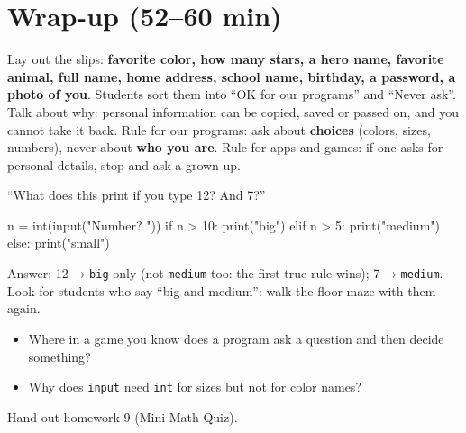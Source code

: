 \section{Wrap-up (52--60 min)}
\begin{safety}
Lay out the slips: \textbf{favorite color, how many stars, a hero name, favorite animal, full name, home address, school name, birthday, a password, a photo of you}. Students sort them into \enquote{OK for our programs} and \enquote{Never ask}. Talk about why: personal information can be copied, saved or passed on, and you cannot take it back. Rule for our programs: ask about \textbf{choices} (colors, sizes, numbers), never about \textbf{who you are}. Rule for apps and games: if one asks for personal details, stop and ask a grown-up.
\end{safety}
\begin{formativecheck}
\enquote{What does this print if you type 12? And 7?}
\begin{pycode}
n = int(input("Number? "))
if n > 10:
    print("big")
elif n > 5:
    print("medium")
else:
    print("small")
\end{pycode}
Answer: 12 → \texttt{big} only (not \texttt{medium} too: the first true rule wins); 7 → \texttt{medium}. Look for students who say \enquote{big and medium}: walk the floor maze with them again.
\end{formativecheck}
\begin{reflection}
\begin{itemize}[leftmargin=1.2em,itemsep=1pt]
  \item Where in a game you know does a program ask a question and then decide something?
  \item Why does \texttt{input} need \texttt{int} for sizes but not for color names?
\end{itemize}
Hand out homework 9 (Mini Math Quiz).
\end{reflection}

